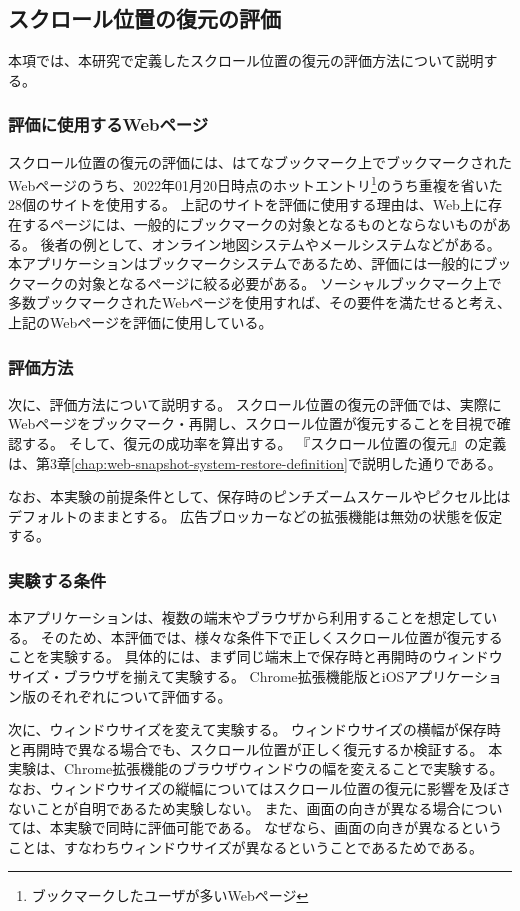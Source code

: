 \subsection{スクロール位置の復元の評価}
本項では、本研究で定義したスクロール位置の復元の評価方法について説明する。

\subsubsection{評価に使用するWebページ}
スクロール位置の復元の評価には、はてなブックマーク上でブックマークされたWebページのうち、2022年01月20日時点のホットエントリ\footnote{ブックマークしたユーザが多いWebページ}のうち重複を省いた28個のサイトを使用する。
上記のサイトを評価に使用する理由は、Web上に存在するページには、一般的にブックマークの対象となるものとならないものがある。
後者の例として、オンライン地図システムやメールシステムなどがある。
本アプリケーションはブックマークシステムであるため、評価には一般的にブックマークの対象となるページに絞る必要がある。
ソーシャルブックマーク上で多数ブックマークされたWebページを使用すれば、その要件を満たせると考え、上記のWebページを評価に使用している。


\subsubsection{評価方法}
次に、評価方法について説明する。
スクロール位置の復元の評価では、実際にWebページをブックマーク・再開し、スクロール位置が復元することを目視で確認する。
そして、復元の成功率を算出する。
『スクロール位置の復元』の定義は、第3章\ref{chap:web-snapshot-system-restore-definition}で説明した通りである。

なお、本実験の前提条件として、保存時のピンチズームスケールやピクセル比はデフォルトのままとする。
広告ブロッカーなどの拡張機能は無効の状態を仮定する。

\subsubsection{実験する条件}
本アプリケーションは、複数の端末やブラウザから利用することを想定している。
そのため、本評価では、様々な条件下で正しくスクロール位置が復元することを実験する。
具体的には、まず同じ端末上で保存時と再開時のウィンドウサイズ・ブラウザを揃えて実験する。
Chrome拡張機能版とiOSアプリケーション版のそれぞれについて評価する。

次に、ウィンドウサイズを変えて実験する。
ウィンドウサイズの横幅が保存時と再開時で異なる場合でも、スクロール位置が正しく復元するか検証する。
本実験は、Chrome拡張機能のブラウザウィンドウの幅を変えることで実験する。
なお、ウィンドウサイズの縦幅についてはスクロール位置の復元に影響を及ぼさないことが自明であるため実験しない。
また、画面の向きが異なる場合については、本実験で同時に評価可能である。
なぜなら、画面の向きが異なるということは、すなわちウィンドウサイズが異なるということであるためである。

